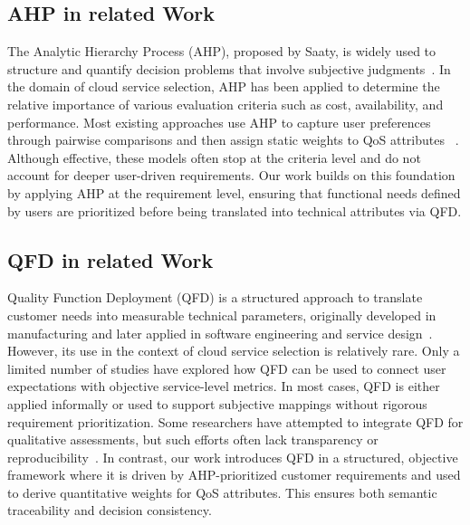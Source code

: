 \documentclass[twocolumn]{svjour3}
\begin{document}
\subsection{AHP in related Work}
The Analytic Hierarchy Process (AHP), proposed by Saaty, is widely used to structure and quantify decision problems that involve subjective judgments~\cite{saaty2004decision}. In the domain of cloud service selection, AHP has been applied to determine the relative importance of various evaluation criteria such as cost, availability, and performance. Most existing approaches use AHP to capture user preferences through pairwise comparisons and then assign static weights to QoS attributes ~\cite{kumar2018novel,saha2021hybrid,tiwari2021g}. Although effective, these models often stop at the criteria level and do not account for deeper user-driven requirements. Our work builds on this foundation by applying AHP at the requirement level, ensuring that functional needs defined by users are prioritized before being translated into technical attributes via QFD.

\subsection{QFD in related Work}
Quality Function Deployment (QFD) is a structured approach to translate customer needs into measurable technical parameters, originally developed in manufacturing and later applied in software engineering and service design~\cite{hering2022quality}. However, its use in the context of cloud service selection is relatively rare. Only a limited number of studies have explored how QFD can be used to connect user expectations with objective service-level metrics. In most cases, QFD is either applied informally or used to support subjective mappings without rigorous requirement prioritization. Some researchers have attempted to integrate QFD for qualitative assessments, but such efforts often lack transparency or reproducibility~\cite{abc}. In contrast, our work introduces QFD in a structured, objective framework where it is driven by AHP-prioritized customer requirements and used to derive quantitative weights for QoS attributes. This ensures both semantic traceability and decision consistency.
\end{document}
